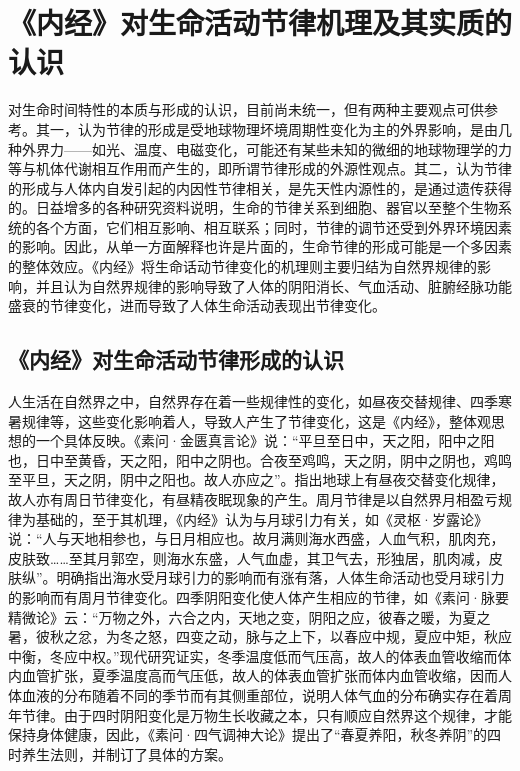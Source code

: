 \documentclass[draft,12pt]{ctexbook}
\begin{document}
\section{《内经》对生命活动节律机理及其实质的认识}%

对生命时间特性的本质与形成的认识，目前尚未统一，但有两种主要观点可供参考。其一，认为节律的形成是受地球物理坏境周期性变化为主的外界影响，是由几种外界力——如光、温度、电磁变化，可能还有某些未知的微细的地球物理学的力等与机体代谢相互作用而产生的，即所谓节律形成的外源性观点。其二，认为节律的形成与人体内自发引起的内因性节律相关，是先天性内源性的，是通过遗传获得的。日益增多的各种研究资料说明，生命的节律关系到细胞、器官以至整个生物系统的各个方面，它们相互影响、相互联系；同时，节律的调节还受到外界环境因素的影响。因此，从单一方面解释也许是片面的，生命节律的形成可能是一个多因素的整体效应。《内经》将生命话动节律变化的机理则主要归结为自然界规律的影响，并且认为自然界规律的影响导致了人体的阴阳消长、气血活动、脏腑经脉功能盛衰的节律变化，进而导致了人体生命活动表现出节律变化。

\subsection{《内经》对生命活动节律形成的认识}%

人生活在自然界之中，自然界存在着一些规律性的变化，如昼夜交替规律、四季寒暑规律等，这些变化影响着人，导致人产生了节律变化，这是《内经》，整体观思想的一个具体反映。《素问·金匮真言论》说：“平旦至日中，天之阳，阳中之阳也，日中至黄昏，天之阳，阳中之阴也。合夜至鸡鸣，天之阴，阴中之阴也，鸡鸣至平旦，天之阴，阴中之阳也。故人亦应之”。指出地球上有昼夜交替变化规律，故人亦有周日节律变化，有昼精夜眠现象的产生。周月节律是以自然界月相盈亏规律为基础的，至于其机理，《内经》认为与月球引力有关，如《灵枢·岁露论》说：“人与天地相参也，与日月相应也。故月满则海水西盛，人血气积，肌肉充，皮肤致……至其月郭空，则海水东盛，人气血虚，其卫气去，形独居，肌肉减，皮肤纵”。明确指出海水受月球引力的影响而有涨有落，人体生命活动也受月球引力的影响而有周月节律变化。四季阴阳变化使人体产生相应的节律，如《素问·脉要精微论》云：“万物之外，六合之内，天地之变，阴阳之应，彼春之暖，为夏之暑，彼秋之忿，为冬之怒，四变之动，脉与之上下，以春应中规，夏应中矩，秋应中衡，冬应中权。”现代研究证实，冬季温度低而气压高，故人的体表血管收缩而体内血管扩张，夏季温度高而气压低，故人的体表血管扩张而体内血管收缩，因而人体血液的分布随着不同的季节而有其侧重部位，说明人体气血的分布确实存在着周年节律。由于四时阴阳变化是万物生长收藏之本，只有顺应自然界这个规律，才能保持身体健康，因此，《素问·四气调神大论》提出了“春夏养阳，秋冬养阴”的四时养生法则，并制订了具体的方案。
\end{document}

